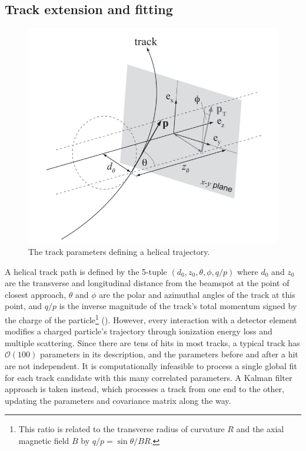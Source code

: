 \subsection{Track extension and fitting}

\begin{figure}[t]
  \includegraphics{track_schematic.png}
  \caption{The track parameters defining a helical trajectory.}
  \label{fig:trk_params}
\end{figure}

A helical track path is defined by the 5-tuple
\( \left( d_0, z_0, \theta, \phi, q/p \right) \)
where $d_0$ and $z_0$ are the transverse and longitudinal distance from the beamspot at the point of closest approach, $\theta$ and $\phi$ are the polar and azimuthal angles of the track at this point, and $q/p$ is the inverse magnitude of the track's total momentum signed by the charge of the particle\footnote{This ratio is related to the transverse radius of curvature $R$ and the axial magnetic field $B$ by $q/p = \sin \theta / B R$.} ().
However, every interaction with a detector element modifies a charged particle's trajectory through ionization energy loss and multiple scattering.
Since there are tens of hits in most tracks, a typical track has $\mathcal{O}(100)$ parameters in its description, and the parameters before and after a hit are not independent.
It is computationally infeasible to process a single global fit for each track candidate with this many correlated parameters.
A Kalman filter approach is taken instead, which processes a track from one end to the other, updating the parameters and covariance matrix along the way.

